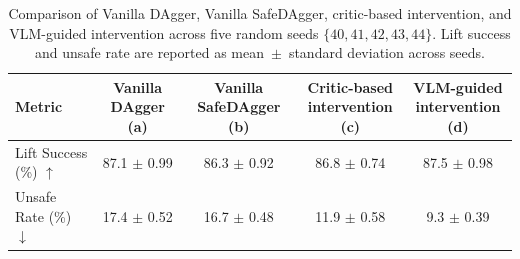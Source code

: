 \begin{table}[H]
\centering
\footnotesize
\caption{Comparison of Vanilla DAgger, Vanilla SafeDAgger, critic-based
intervention, and VLM-guided intervention across five random seeds
$\{40,41,42,43,44\}$. Lift success and unsafe rate are reported as
mean~$\pm$~standard deviation across seeds.}
\label{tab:ablation_across_seeds}
\setlength{\tabcolsep}{6pt}
\renewcommand{\arraystretch}{1.12}
\begin{tabular}{lcccc}
\toprule
Metric & \makecell{Vanilla DAgger\\(a)}
& \makecell{Vanilla SafeDAgger\\(b)}
& \makecell{Critic-based\\intervention (c)}
& \makecell{VLM-guided\\intervention (d)} \\
\midrule
Lift Success (\%) $\uparrow$
& 87.1 $\pm$ 0.99 & 86.3 $\pm$ 0.92 & 86.8 $\pm$ 0.74 & 87.5 $\pm$ 0.98 \\
Unsafe Rate (\%) $\downarrow$
& 17.4 $\pm$ 0.52 & 16.7 $\pm$ 0.48 & 11.9 $\pm$ 0.58 & 9.3 $\pm$ 0.39 \\
\bottomrule
\end{tabular}
\end{table}
